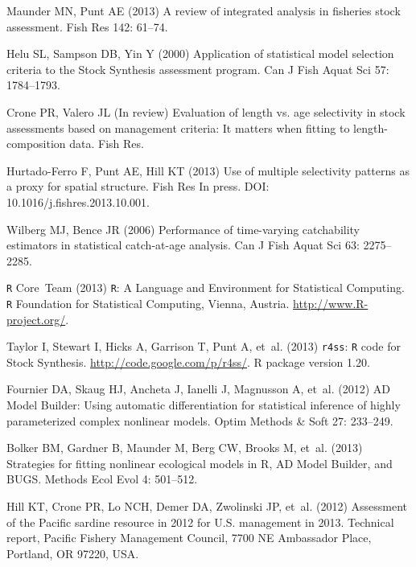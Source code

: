 \documentclass[12pt]{article}
\begin{document}
\begin{thebibliography}{10}
Maunder MN, Punt AE (2013) A review of integrated analysis in fisheries stock
  assessment.
\newblock Fish Res 142: 61--74.

Helu SL, Sampson DB, Yin Y (2000) Application of statistical model selection
  criteria to the {Stock Synthesis} assessment program.
\newblock Can J Fish Aquat Sci 57: 1784--1793.

Crone PR, Valero JL (In review) Evaluation of length vs. age selectivity in
  stock assessments based on management criteria: It matters when fitting to
  length-composition data.
\newblock Fish Res.

Hurtado-Ferro F, Punt AE, Hill KT (2013) Use of multiple selectivity patterns
  as a proxy for spatial structure.
\newblock Fish Res In press. DOI: 10.1016/j.fishres.2013.10.001.

Wilberg MJ, Bence JR (2006) Performance of time-varying catchability estimators
  in statistical catch-at-age analysis.
\newblock Can J Fish Aquat Sci 63: 2275--2285.

\texttt{R} Core~Team (2013) \texttt{R}: A Language and Environment for
  Statistical Computing.
\newblock \texttt{R} Foundation for Statistical Computing, Vienna, Austria.
\newblock \urlprefix\url{http://www.R-project.org/}.

Taylor I, Stewart I, Hicks A, Garrison T, Punt A, et~al. (2013) \texttt{r4ss}:
  \texttt{R} code for Stock Synthesis.
\newblock \urlprefix\url{http://code.google.com/p/r4ss/}.
\newblock R package version 1.20.

Fournier DA, Skaug HJ, Ancheta J, Ianelli J, Magnusson A, et~al. (2012) {AD
  Model Builder}: Using automatic differentiation for statistical inference of
  highly parameterized complex nonlinear models.
\newblock Optim Methods \& Soft 27: 233--249.

Bolker BM, Gardner B, Maunder M, Berg CW, Brooks M, et~al. (2013) Strategies
  for fitting nonlinear ecological models in {R}, {AD Model Builder}, and
  {BUGS}.
\newblock Methods Ecol Evol 4: 501--512.

Hill KT, Crone PR, Lo NCH, Demer DA, Zwolinski JP, et~al. (2012) Assessment of
  the {Pacific} sardine resource in 2012 for {U.S.} management in 2013.
\newblock Technical report, Pacific Fishery Management Council, 7700 NE
  Ambassador Place, Portland, OR 97220, USA.


\end{thebibliography}
\end{document}
